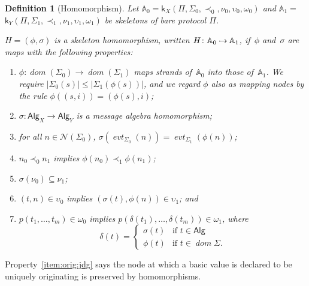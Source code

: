 \documentclass[12pt]{article}
\newcommand{\fn}[1]{\ensuremath{\operatorname{\mathit{#1}}}}
\newcommand{\sdom}{\fn{dom}}
\newcommand{\skel}{\mathbb{A}}
\newcommand{\skl}{\mathsf{k}}
\newcommand{\nodes}{\ensuremath{\mathcal{N}}}
\newcommand{\evt}{\fn{evt}}
\newcommand{\length}[1]{\ensuremath{|#1|}}
\newcommand{\morph}{\ensuremath{\mathbin{\cdot\joinrel\!\!\rightarrow}}}
\newcommand{\alg}[1]{\ensuremath{\mathsf{#1}}}
\newcommand{\msg}{\alg{Alg}}
\newcommand{\atom}{basic value}
\newcommand{\indefart}{a}
\newcommand{\ssp}{\Sigma}
\newcommand{\strands}{\sdom}
\newtheorem{definition}{Definition}
\begin{document}
\begin{definition}[Homomorphism]\label{def:homomorphism}
  Let $\skel_0=\skl_X(\Pi,\ssp_0,\prec_0,\nu_0,\upsilon_0,\omega_0)$ and
  $\skel_1=$ $\skl_Y(\Pi,\ssp_1,\prec_1,\nu_1,\upsilon_1,\omega_1)$ be
  skeletons of bare protocol $\Pi$.

  $H=(\phi,\sigma)$ is a \emph{skeleton homomorphism}, written
  $H\colon \skel_0\morph \skel_1$, if~$\phi$ and~$\sigma$ are maps
  with the following properties:
  \begin{enumerate}
    \item $\phi\colon\strands(\ssp_0)\to\strands(\ssp_1)$ maps strands
    of~$\skel_0$ into those of~$\skel_1$.  We require
    $\length{\ssp_0(s)}\le\length{\ssp_1(\phi(s))}$, and we regard
    $\phi$ also as mapping nodes by the rule
    $\phi((s,i))=(\phi(s),i)$;
    \item $\sigma\colon\msg_X\to\msg_Y$ is a message algebra homomorphism;
    \item for all $n\in\nodes(\ssp_0)$,
    $\sigma(\evt_{\ssp_0}(n))=\evt_{\ssp_1}(\phi(n))$;
    \item $n_0\prec_0 n_1$ implies $\phi(n_0)\prec_1\phi(n_1)$;
    \item $\sigma(\nu_0)\subseteq \nu_1$;
    \item\label{item:orig:jdg} $(t,n)\in \upsilon_0$ implies
      $(\sigma(t), \phi(n))\in \upsilon_1$; and
    \item $p(t_1,\ldots,t_m)\in\omega_0$ implies
      $p(\delta(t_1),\ldots,\delta(t_m))\in\omega_1$, where
      \[\delta(t)=\left\{
      \begin{array}{ll}
        \sigma(t)&\mbox{if $t\in\msg$}\\
        \phi(t)&\mbox{if $t\in\sdom{\ssp}$.}
      \end{array}\right.
      \]

  \end{enumerate}
%
\end{definition}
%
Property~\ref{item:orig:jdg} says the node at which {\indefart}
{\atom} is declared to be uniquely originating is preserved by
homomorphisms.
%
\end{document}
